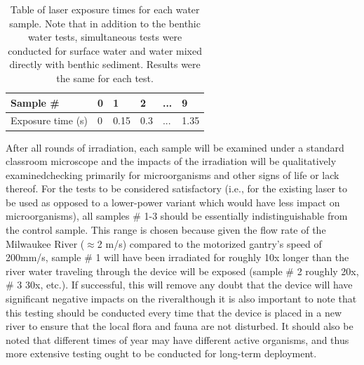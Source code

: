 \documentclass[fleqn,10pt]{SelfArx} %
\begin{document}
	\begin{table}[h]
		\begin{tabular}{|l|l|l|l|l|l|}
			\hline
			Sample \#         & 0 & 1    & 2   & ... & 9    \\ \hline
			Exposure time (s) & 0 & 0.15 & 0.3 & ... & 1.35 \\ \hline
		\end{tabular}
		\caption[Laser Exposure Time Table]{Table of laser exposure times for each water sample. Note that in addition to the benthic water tests, simultaneous tests were conducted for surface water and water mixed directly with benthic sediment. Results were the same for each test.}
	\end{table}
	
	After all rounds of irradiation, each sample will be examined under a standard classroom microscope and the impacts of the irradiation will be qualitatively examined\textemdash checking primarily for microorganisms and other signs of life or lack thereof. For the tests to be considered satisfactory (i.e., for the existing laser to be used as opposed to a lower-power variant which would have less impact on microorganisms), all samples \# 1-3 should be essentially indistinguishable from the control sample. This range is chosen because given the flow rate of the Milwaukee River ($\approx$2 m/s) compared to the motorized gantry’s speed of 200mm/s, sample \# 1 will have been irradiated for roughly 10x longer than the river water traveling through the device will be exposed (sample \# 2 roughly 20x, \# 3 30x, etc.). If successful, this will remove any doubt that the device will have significant negative impacts on the river\textemdash although it is also important to note that this testing should be conducted every time that the device is placed in a new river to ensure that the local flora and fauna are not disturbed. It should also be noted that different times of year may have different active organisms, and thus more extensive testing ought to be conducted for long-term deployment.
 
\end{document}
